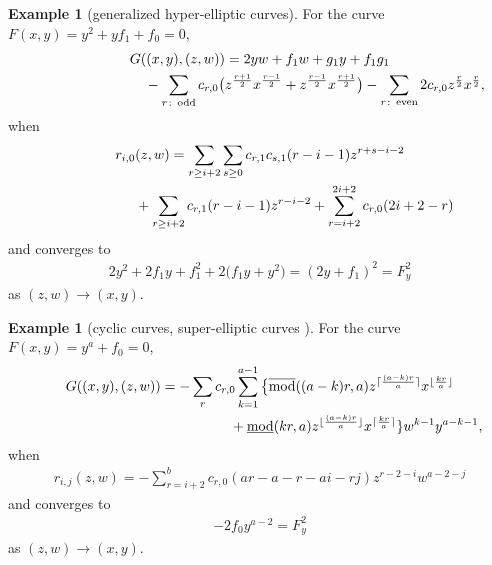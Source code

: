 \documentclass[pdftex]{sigma}
\numberwithin{equation}{section}
\theoremstyle{definition}
\newtheorem{rei}[teiri]{Example}
\begin{document}
\begin{rei}[generalized hyper-elliptic curves]\rm
For the curve $F(x,y)=y^2+yf_1+f_0=0$,
\begin{gather*}
G((x,y),(z,w))=2yw+f_1w+g_1y+f_1g_1\\
\hphantom{G((x,y),(z,w))=}{}
-\sum_{r\colon \, {\rm odd}}c_{r,0}\big(z^{\frac{r+1}{2}}x^{\frac{r-1}{2}}+z^{\frac{r-1}{2}}x^{\frac{r+1}{2}}\big) -\sum_{r\colon \, {\rm even}}2c_{r,0}z^{\frac{r}{2}}x^{\frac{r}{2}},
\end{gather*}
when
\begin{gather*}
r_{i,0}(z,w)=\sum_{r\geq i+2}\sum_{s\geq 0}c_{r,1}c_{s,1}(r-i-1)z^{r+s-i-2}\\
\hphantom{r_{i,0}(z,w)=}{}
+\sum_{r\geq i+2}c_{r,1}(r-i-1)z^{r-i-2}+\sum_{r=i+2}^{2i+2}c_{r,0}(2i+2-r)
\end{gather*}
and converges to
\begin{gather*}2y^2+2f_1y+f_1^2+2\big(f_1y+y^2\big)=(2y+f_1)^2=F_y^2\end{gather*}
as $(z,w)\rightarrow (x,y)$.
\end{rei}
\begin{rei}[cyclic curves, super-elliptic curves \cite{gal}]
For the curve $F(x,y)=y^a+f_0=0$,
\begin{gather*}G((x,y),(z,w))=
-\sum_r c_{r,0}\sum_{k=1}^{a-1}\big\{\overline{\rm mod}((a-k)r,a)z^{\lceil\frac{(a-k)r}{a}\rceil}x^{\lfloor\frac{kr}{a}\rfloor}\\
\hphantom{G((x,y),(z,w))=-\sum_r c_{r,0}\sum_{k=1}^{a-1}}{}
+\underline{\rm mod}(kr,a)z^{\lfloor\frac{(a-k)r}{a}\rfloor}x^{\lceil\frac{kr}{a}\rceil} \}w^{k-1}y^{a-k-1},
\end{gather*}
when
\begin{gather*}r_{i,j}(z,w)= -\sum_{r=i+2}^b c_{r,0} (ar-a-r-ai-rj) z^{r-2-i}w^{a-2-j}
\end{gather*}
and converges to
\begin{gather*}-2f_0y^{a-2}=F_y^2\end{gather*} as $(z,w)\rightarrow (x,y)$.
\end{rei}
\end{document}
